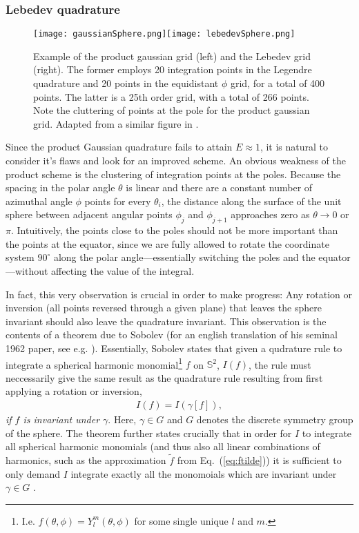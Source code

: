\documentclass[a4paper]{article}
\newcommand{\eq} [1]{Eq.\ (\ref{eq:#1})}
\newcommand{\comment}[1]{\ignorespaces}
\begin{document}
\subsubsection{Lebedev quadrature}
\begin{figure}
\centering
\texttt{[image: gaussianSphere.png]}\texttt{[image: lebedevSphere.png]}
\caption{Example of the product gaussian grid (left) and the Lebedev grid (right). The former employs 20 integration points in the Legendre quadrature and 20 points in the equidistant $\phi$ grid, for a total of 400 points. The latter is a 25th order grid, with a total of 266 points. Note the cluttering of points at the pole for the product gaussian grid. Adapted from a similar figure in \cite{beentjes}\comment{p4}.\label{fig:dft1}}
\end{figure}
Since the product Gaussian quadrature fails to attain $E\approx1$, it is natural to consider it's flaws and look for an improved scheme. An obvious weakness of the product scheme is the clustering of integration points at the poles. Because the spacing in the polar angle $\theta$ is linear and there are a constant number of azimuthal angle $\phi$ points for every $\theta_i$, the distance along the surface of the unit sphere between adjacent angular points $\phi_j$ and $\phi_{j+1}$ approaches zero as $\theta\rightarrow0$ or $\pi$. Intuitively, the points close to the poles should not be more important than the points at the equator, since we are fully allowed to rotate the coordinate system $90^\circ$ along the polar angle\----essentially switching the poles and the equator\----without affecting the value of the integral.

In fact, this very observation is crucial in order to make progress: Any rotation or inversion (all points reversed through a given plane) that leaves the sphere invariant should also leave the quadrature invariant. This observation is the contents of a theorem due to Sobolev (for an english translation of his seminal 1962 paper, see e.g. \cite{sobolev}\comment{p461}). Essentially, Sobolev states that given a qudrature rule to integrate a spherical harmonic monomial\footnote{I.e. $f(\theta,\phi)=Y^m_l(\theta,\phi)$ for some single unique $l$ and $m$.} $f$ on $\mathbb{S}^2$, $I(f)$, the rule must neccessarily give the same result as the quadrature rule resulting from first applying a rotation or inversion,
\begin{align}
I(f)=I(\gamma[f]),
\end{align}
\emph{if $f$ is invariant under $\gamma$}. Here, $\gamma\in G$ and $G$ denotes the discrete symmetry group of the sphere. The theorem further states crucially that in order for $I$ to integrate all spherical harmonic monomials (and thus also all linear combinations of harmonics, such as the approximation $\tilde f$ from \eq{ftilde}) it is sufficient to only demand $I$ integrate exactly all the monomoials which are invariant under $\gamma\in G$ \cite{atkinson}\comment{p185}. 
\end{document}
